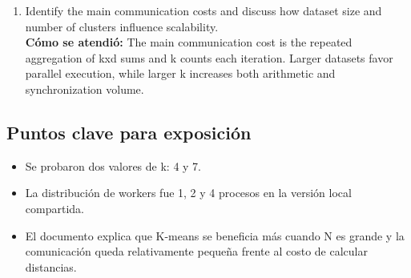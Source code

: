 \documentclass[11pt]{article}
\begin{document}
\begin{enumerate}[leftmargin=*]
\textbf{Cómo se atendió:} For the tested local subset, the multiprocessing version stayed slower than the serial version because synchronization and worker overhead remained important. The document explains that larger datasets and truly distributed memory can shift that balance.
\item Identify the main communication costs and discuss how dataset size and number of clusters influence scalability.\\
\textbf{Cómo se atendió:} The main communication cost is the repeated aggregation of kxd sums and k counts each iteration. Larger datasets favor parallel execution, while larger k increases both arithmetic and synchronization volume.
\end{enumerate}
\subsection*{Puntos clave para exposición}
\begin{itemize}[leftmargin=*]
\item Se probaron dos valores de k: 4 y 7.
\item La distribución de workers fue 1, 2 y 4 procesos en la versión local compartida.
\item El documento explica que K-means se beneficia más cuando N es grande y la comunicación queda relativamente pequeña frente al costo de calcular distancias.
\end{itemize}
\end{document}
